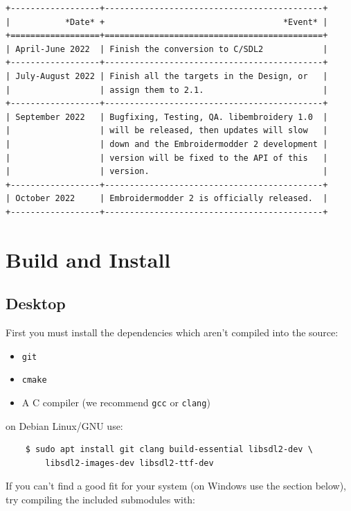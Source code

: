 \documentclass[a4paper]{report}
\begin{document}
\begin{lstlisting}
+------------------+--------------------------------------------+
|           *Date* +                                    *Event* |
+==================+============================================+
| April-June 2022  | Finish the conversion to C/SDL2            |
+------------------+--------------------------------------------+
| July-August 2022 | Finish all the targets in the Design, or   |
|                  | assign them to 2.1.                        |
+------------------+--------------------------------------------+
| September 2022   | Bugfixing, Testing, QA. libembroidery 1.0  |
|                  | will be released, then updates will slow   |
|                  | down and the Embroidermodder 2 development |
|                  | version will be fixed to the API of this   |
|                  | version.                                   |
+------------------+--------------------------------------------+
| October 2022     | Embroidermodder 2 is officially released.  |
+------------------+--------------------------------------------+
\end{lstlisting}

\section{Build and Install}

\subsection{Desktop}

First you must install the dependencies which aren't compiled into the source:

\begin{itemize}
\item \texttt{git}
\item \texttt{cmake}
\item A C compiler (we recommend \texttt{gcc} or \texttt{clang})
\end{itemize}

on Debian Linux/GNU use:

\begin{lstlisting}
    $ sudo apt install git clang build-essential libsdl2-dev \
        libsdl2-images-dev libsdl2-ttf-dev
\end{lstlisting}

If you can't find a good fit for your system (on Windows use the section below),
try compiling the included submodules with:
\end{document}
